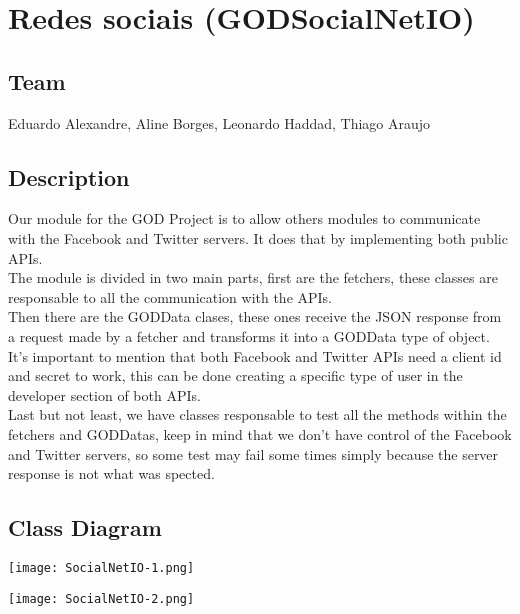\section{Redes sociais (GODSocialNetIO)}
\label{sec-1}
\subsection{Team}
\label{sec-1-1}

  Eduardo Alexandre, Aline Borges, Leonardo Haddad, Thiago Araujo
\subsection{Description}
\label{sec-1-2}

  Our module for the GOD Project is to allow others modules to communicate with the Facebook and Twitter servers. It does that by implementing both public APIs.\\

  The module is divided in two main parts, first are the fetchers, these classes are responsable to all the communication with the APIs.\\

  Then there are the GODData clases, these ones receive the JSON response from a request made by a fetcher and transforms it into a GODData type of object.\\

  It's important to mention that both Facebook and Twitter APIs need a client id and secret to work, this can be done creating a specific type of user in the developer section of both APIs.\\

  Last but not least, we have classes responsable to test all the methods within the fetchers and GODDatas, keep in mind that we don't have control of the Facebook and Twitter servers, so some test may fail some times simply because the server response is not what was spected.
\subsection{Class Diagram}
\label{sec-1-3}

\begin{center}
\texttt{[image: SocialNetIO-1.png]}
\end{center}

\begin{center}
\texttt{[image: SocialNetIO-2.png]}
\end{center}
